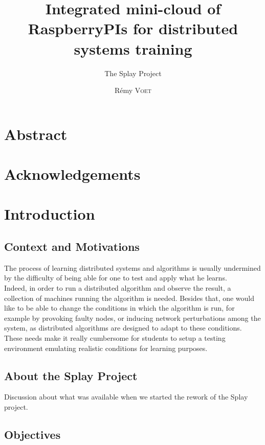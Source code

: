 \documentclass{eplmastersthesis}
\title{Integrated mini-cloud of RaspberryPIs for distributed systems training}
\subtitle{The Splay Project}
\author{Rémy \textsc{Voet}}
\begin{document}
  \maketitle

  \chapter*{Abstract}

  \chapter*{Acknowledgements}

  \tableofcontents

  \chapter{Introduction}

    \section{Context and Motivations}

      The process of learning distributed systems and algorithms is usually
      undermined by the difficulty of being able for one to test and apply
      what he learns.\\
      Indeed, in order to run a distributed algorithm and observe the result, a
      collection of machines running the algorithm is needed. Besides that,
      one would like to be able to change the conditions in which the algorithm
      is run, for example by provoking faulty nodes, or inducing network
      perturbations among the system, as distributed algorithms are designed to
      adapt to these conditions. These needs make it really cumbersome
      for students to setup a testing environment emulating realistic
      conditions for learning purposes.

    \section{About the Splay Project}

      Discussion about what was available when we started the rework of
      the Splay project.

    \section{Objectives}
\end{document}
